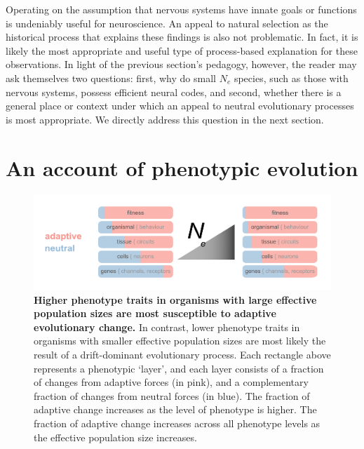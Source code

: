 \documentclass[twocolumn]{article}
\begin{document}
Operating on the assumption that nervous systems have innate goals or functions is undeniably useful for neuroscience. An appeal to natural selection as the historical process that explains these findings is also not problematic. In fact, it is likely the most appropriate and useful type of process-based explanation for these observations. In light of the previous section's pedagogy, however, the reader may ask themselves two questions: first, why do small $N_e$ species, such as those with nervous systems, possess efficient neural codes, and second, whether there is a general place or context under which an appeal to neutral evolutionary processes is most appropriate. We directly address this question in the next section.

\section{An account of phenotypic evolution}

\begin{figure}[htp]
\centering
\includegraphics[width=17 cm]{fig_3.png}
\caption{\textbf{Higher phenotype traits in organisms with large effective population sizes are most susceptible to adaptive evolutionary change.} In contrast, lower phenotype traits in organisms with smaller effective population sizes are most likely the result of a drift-dominant evolutionary process. Each rectangle above represents a phenotypic `layer', and each layer consists of a fraction of changes from adaptive forces (in pink), and a complementary fraction of changes from neutral forces (in blue). The fraction of adaptive change increases as the level of phenotype is higher. The fraction of adaptive change increases across all phenotype levels as the effective population size increases.}
\label{fig_framework}
\end{figure}
\end{document}
